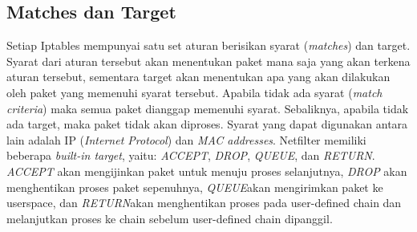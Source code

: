 \subsection{Matches dan Target}
Setiap Iptables mempunyai satu set aturan berisikan syarat (\textit{matches}) dan target. Syarat dari aturan tersebut akan menentukan paket mana saja yang akan terkena aturan tersebut, sementara target akan menentukan apa yang akan dilakukan oleh paket yang memenuhi syarat tersebut. Apabila tidak ada syarat (\textit{match criteria}) maka semua paket dianggap memenuhi syarat. Sebaliknya, apabila tidak ada target, maka paket tidak akan diproses. Syarat yang dapat digunakan antara lain adalah IP (\textit{Internet Protocol}) dan \textit{MAC addresses}.
Netfilter memiliki beberapa \textit{built-in target}, yaitu: \textit{ACCEPT}, \textit{DROP}, \textit{QUEUE}, dan \textit{RETURN}. 
\textit{ACCEPT} akan mengijinkan paket untuk menuju proses selanjutnya,
\textit{DROP} akan menghentikan proses paket sepenuhnya,
\textit{QUEUE}akan mengirimkan paket ke userspace, dan 
\textit{RETURN}akan menghentikan proses pada user-defined chain dan melanjutkan proses ke chain sebelum user-defined chain dipanggil.